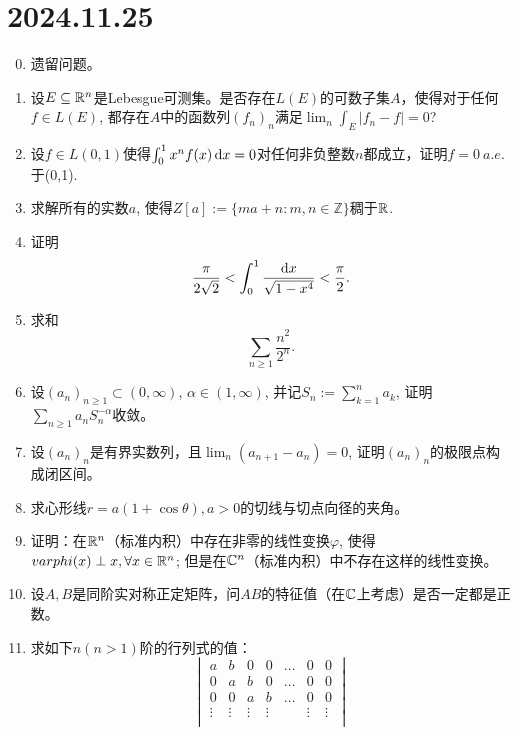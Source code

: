 \section*{2024.11.25}
\begin{enumerate}\setcounter{enumi}{-1}
    \item 遗留问题。
    \item 设$E\subseteq \mathbb{R}^n$是Lebesgue可测集。是否存在$L(E)$的可数子集$A$，使得对于任何$f\in L(E)$, 都存在$A$中的函数列$(f_n)_n$满足$\lim_n \int_E |f_n-f|=0$?
    \item 设$f\in L(0,1)$使得$\int_{0}^{1} x^nf(x)\mathop{}\!\mathrm{d} x=0$对任何非负整数$n$都成立，证明$f=0\ a.e.$ 于(0,1).
    \item 求解所有的实数$a$, 使得$Z[a]:=\{ma+n\colon m,n\in\mathbb{Z}\}$稠于$\mathbb{R}$.
    \item 证明\begin{equation*}
        \frac{\pi}{2\sqrt{2}}<\int_{0}^{1}\frac{\mathop{}\!\mathrm{d} x}{\sqrt{1-x^4}}<\frac{\pi}{2}.
    \end{equation*}
    \item 求和\begin{equation*}
        \sum_{n\geqslant 1}\frac{n^2}{2^n}.
    \end{equation*}
    \item 设$(a_n)_{n\geqslant 1}\subset (0,\infty)$, $\alpha\in (1,\infty)$, 并记$S_n:=\sum_{k=1}^{n} a_k$, 证明$\sum_{n\geqslant 1}a_nS_n^{-\alpha}$收敛。
    \item 设$(a_n)_{n}$是有界实数列，且$\lim_{n}(a_{n+1}-a_n)=0$, 证明$(a_n)_n$的极限点构成闭区间。
    \item 求心形线$r=a(1+\cos \theta),a>0$的切线与切点向径的夹角。
    \item 证明：在$\mathbb{R}^n$（标准内积）中存在非零的线性变换$\varphi$, 使得$varphi(x)\perp x,\forall x\in \mathbb{R}^n$; 但是在$\mathbb{C}^n$（标准内积）中不存在这样的线性变换。
    \item 设$A, B$是同阶实对称正定矩阵，问$AB$的特征值（在$\mathbb{C}$上考虑）是否一定都是正数。
    \item 求如下$n(n>1)$阶的行列式的值：
    \begin{equation*}
        \begin{vmatrix}
            a & b & 0 & 0 & \dots & 0 & 0 \\
            0 & a & b & 0 & \dots & 0 & 0 \\
            0 & 0 & a & b & \dots & 0 & 0 \\
            \vdots & \vdots & \vdots & \vdots & & \vdots & \vdots \\

\end{vmatrix}
\end{equation*}
\end{enumerate}
